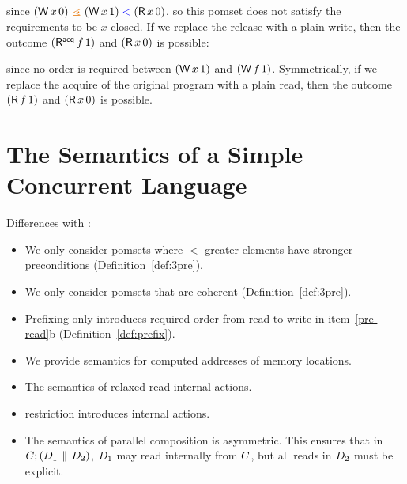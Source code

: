 since $(\DW x0) \gtN (\DW x1) \lt (\DR x0)$, so this pomset does not satisfy the
requirements to be $x$-closed.
If we replace the release
with a plain write, then the outcome $(\DRAcq f1)$ and $(\DR x0)$ is possible:
\begin{tikzdisplay}[node distance=1em]
\end{tikzdisplay}
since no order is required between $(\DW x1)$ and $(\DW f1)$.  
Symmetrically, if we replace the acquire of the original program
with a plain read, then the outcome $(\DR f1)$ and $(\DR x0)$ is possible.

\section{The Semantics of a Simple Concurrent Language}
\label{sec:model}

Differences with \cite{2019-sp}:
\begin{itemize}
\item We only consider pomsets where $\lt$-greater elements have stronger
  preconditions (Definition~\ref{def:3pre}).
\item We only consider pomsets that are coherent (Definition~\ref{def:3pre}).
\item Prefixing only introduces required order from read to write in item~\ref{pre-read}b (Definition~\ref{def:prefix}).
\item We provide semantics for computed addresses of memory locations.
\item The semantics of relaxed read internal actions.
\item restriction introduces internal actions.
\item The semantics of parallel composition is asymmetric.  This ensures that
  in $C;(D_1\,\mathbin{\|}\,D_2)$, $D_1$ may read internally from $C$,
  but all reads in $D_2$ must be explicit.
\end{itemize}



